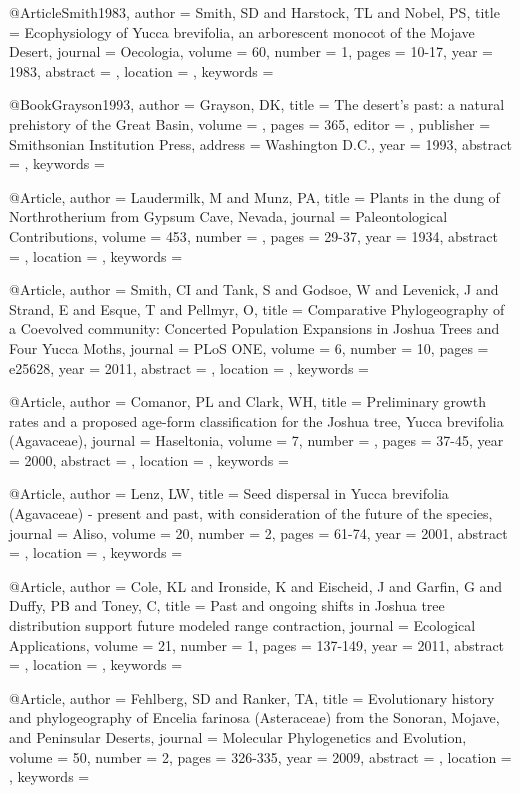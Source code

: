 @Article{Smith1983,
author = {Smith, SD and Harstock, TL and Nobel, PS}, 
title = {Ecophysiology of Yucca brevifolia, an arborescent monocot of the Mojave Desert}, 
journal = {Oecologia}, 
volume = {60}, 
number = {1}, 
pages = {10-17}, 
year = {1983}, 
abstract = {}, 
location = {}, 
keywords = {}}


@Book{Grayson1993,
author = {Grayson, DK}, 
title = {The desert's past: a natural prehistory of the Great Basin}, 
volume = {}, 
pages = {365}, 
editor = {}, 
publisher = {Smithsonian Institution Press}, 
address = {Washington D.C.}, 
year = {1993}, 
abstract = {}, 
keywords = {}}

@Article{,
author = {Laudermilk, M and Munz, PA}, 
title = {Plants in the dung of Northrotherium from Gypsum Cave, Nevada}, 
journal = {Paleontological Contributions}, 
volume = {453}, 
number = {}, 
pages = {29-37}, 
year = {1934}, 
abstract = {}, 
location = {}, 
keywords = {}}


@Article{,
author = {Smith, CI and Tank, S and Godsoe, W and Levenick, J and Strand, E and Esque, T and Pellmyr, O}, 
title = {Comparative Phylogeography of a Coevolved community: Concerted Population Expansions in Joshua Trees and Four Yucca Moths}, 
journal = {PLoS ONE}, 
volume = {6}, 
number = {10}, 
pages = {e25628}, 
year = {2011}, 
abstract = {}, 
location = {}, 
keywords = {}}


@Article{,
author = {Comanor, PL and Clark, WH}, 
title = {Preliminary growth rates and a proposed age-form classification for the Joshua tree, Yucca brevifolia (Agavaceae)}, 
journal = {Haseltonia}, 
volume = {7}, 
number = {}, 
pages = {37-45}, 
year = {2000}, 
abstract = {}, 
location = {}, 
keywords = {}}


@Article{,
author = {Lenz, LW}, 
title = {Seed dispersal in Yucca brevifolia (Agavaceae) - present and past, with consideration of the future of the species}, 
journal = {Aliso}, 
volume = {20}, 
number = {2}, 
pages = {61-74}, 
year = {2001}, 
abstract = {}, 
location = {}, 
keywords = {}}


@Article{,
author = {Cole, KL and Ironside, K and Eischeid, J and Garfin, G and Duffy, PB and Toney, C}, 
title = {Past and ongoing shifts in Joshua tree distribution support future modeled range contraction}, 
journal = {Ecological Applications}, 
volume = {21}, 
number = {1}, 
pages = {137-149}, 
year = {2011}, 
abstract = {}, 
location = {}, 
keywords = {}}


@Article{,
author = {Fehlberg, SD and Ranker, TA}, 
title = {Evolutionary history and phylogeography of Encelia farinosa (Asteraceae) from the Sonoran, Mojave, and Peninsular Deserts}, 
journal = {Molecular Phylogenetics and Evolution}, 
volume = {50}, 
number = {2}, 
pages = {326-335}, 
year = {2009}, 
abstract = {}, 
location = {}, 
keywords = {}}


